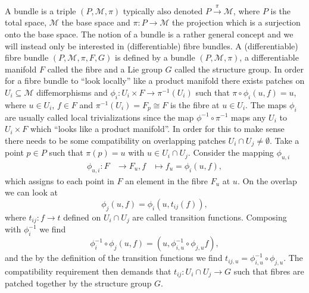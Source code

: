 A bundle is a triple $(P,\mathcal{M},\pi)$ typically also denoted $P\overset{\pi}{\longrightarrow}\mathcal{M}$, where $P$ is the total space, $\mathcal{M}$ the base space and $\pi: P\to \mathcal{M}$ the projection which is a surjection onto the base space. The notion of a bundle is a rather general concept and we will instead only be interested in (differentiable) fibre bundles. A (differentiable) fibre bundle $(P,\mathcal{M},\pi,F,G)$ is defined by a bundle $(P,\mathcal{M},\pi)$, a differentiable manifold $F$ called the fibre and a Lie group $G$ called the structure group. In order for a fibre bundle to ``look locally'' like a product manifold there exists patches on $U_i\subseteq \mathcal{M}$ diffemorphisms and $\phi_i: U_i\times F\to \pi^{-1}(U_i)$ such that $\pi\circ \phi_i(u,f)=u$, where $u\in U_i$, $f\in F$ and $\pi^{-1}(U_i)=F_p\cong F$ is the fibre at $u\in U_i$. The maps $\phi_i$ are usually called local trivializations since the map $\phi^{-1}\circ \pi^{-1}$ maps any $U_i$ to $U_i\times F$ which ``looks like a product manifold''. In order for this to make sense there needs to be some compatibility on overlapping patches $U_i\cap U_j\neq \emptyset$. Take a point $p\in P$ such that $\pi(p)=u$ with $u\in U_i\cap U_j$. Consider the mapping $\phi_{u,i}$
\begin{equation}
    \begin{aligned}
        \phi_{u,i}: F&\to F_u,
            f&\mapsto f_u = \phi_i(u,f),
    \end{aligned}
\end{equation}
which assigns to each point in $F$ an element in the fibre $F_u$ at $u$. On the overlap we can look at 
\begin{equation}
    \phi_{j}(u,f) = \phi_{i}(u,t_{ij}(f)),
\end{equation}
where $t_{ij}:f\to t$ defined on $U_i\cap U_j$ are called transition functions. Composing with $\phi_i^{-1}$ we find 
\begin{equation}
    \phi_{i}^{-1}\circ\phi_j (u,f) = (u,\phi^{-1}_{i,u}\circ \phi_{j,u}f),
\end{equation}
and the by the definition of the transition functions we find $t_{ij,u}=\phi^{-1}_{i,u}\circ \phi_{j,u}$. The compatibility requirement then demands that $t_{ij}: U_i\cap U_j\to G$ such that fibres are patched together by the structure group $G$.  



